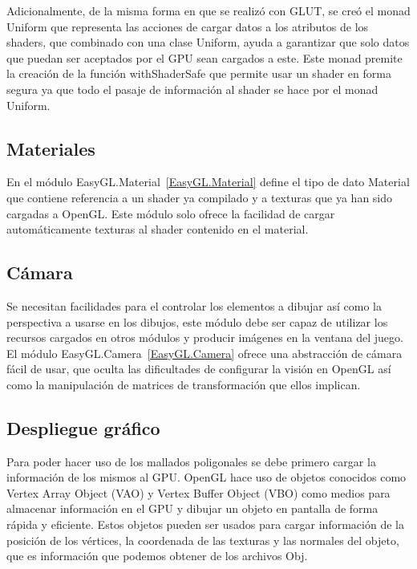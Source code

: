 Adicionalmente, de la misma forma en que se realizó con GLUT,  se creó el monad Uniform que representa las acciones de cargar datos a los atributos de los shaders, que combinado con una clase Uniform, ayuda a garantizar que solo datos que puedan ser aceptados por el GPU sean cargados a este. Este monad premite la creación de la función withShaderSafe que permite usar un shader en forma segura ya que todo el pasaje de información al shader se hace por el monad Uniform.

\subsection{Materiales}

En el módulo EasyGL.Material~\ref{EasyGL.Material} define el tipo de dato Material que contiene referencia a un shader ya compilado y a texturas que ya han sido cargadas a OpenGL. Este módulo solo ofrece la facilidad de cargar automáticamente texturas al shader contenido en el material.

\subsection{Cámara}

Se necesitan facilidades para el controlar los elementos a dibujar así como la perspectiva a usarse en los dibujos, este módulo debe ser capaz de utilizar los recursos cargados en otros módulos y producir imágenes en la ventana del juego. El módulo EasyGL.Camera~\ref{EasyGL.Camera} ofrece una abstracción de cámara fácil de usar, que oculta las dificultades de configurar la visión en OpenGL así como la manipulación de matrices de transformación que ellos implican.

\subsection{Despliegue gráfico}

Para poder hacer uso de los mallados poligonales se debe primero cargar la información de los mismos al GPU. OpenGL hace uso de objetos conocidos como Vertex Array Object (VAO) y Vertex Buffer Object (VBO) como medios para almacenar información en el GPU y dibujar un objeto en pantalla de forma rápida y eficiente. Estos objetos pueden ser usados para cargar información de la posición de los vértices, la coordenada de las texturas y las normales del objeto, que es información que podemos obtener de los archivos Obj.

